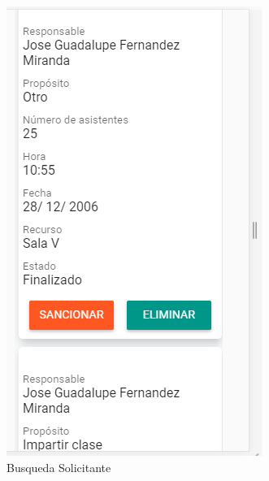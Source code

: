 \begin{enumerate}
\begin{figure}[hbtp]
	\includegraphics[scale=0.3]{images/InterfazMovil/IUGS07_busqueda.PNG}
	\caption{Busqueda Solicitante}
	\end{figure}
	
\end{enumerate}

